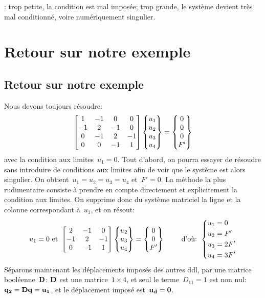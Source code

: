 \medskip
{}: trop petite, la condition est mal imposée; 
trop grande, le système devient très mal conditionné, voire numériquement singulier.

\medskip
\ifVersionAvecExemplesSepares
  \section{Retour sur notre exemple}
\else
  \subsection{Retour sur notre exemple}
\fi
Nous devons toujours résoudre:
\begin{equation}
\MM*{1 & -1 & 0 & 0 \\ -1 & 2 & -1 & 0 \\ 0 & -1 & 2 & -1\\ 0&0&-1&1}
\VV*{u_1\\u_2\\u_3\\u_4}
=
\VV*{0\\0\\0\\F'}
\end{equation}
avec la condition aux limites~$u_1=0$.
\medskipvm
Tout d'abord, on pourra essayer de résoudre sans introduire de conditions aux limites afin de voir que le système est alors singulier. On obtient~$u_1=u_2=u_3=u_4$ et~$F'=0$.
\medskipvm
La méthode la plus rudimentaire consiste à prendre en compte directement et explicitement la condition aux limites.
On supprime donc du système matriciel la ligne et la colonne correspondant à~$u_1$, et on résout:
\begin{equation}\label{Eq-Base}
u_1=0 \text{ et }
\MM*{2 & -1 & 0 \\ -1 & 2 & -1\\ 0&-1&1}
\VV*{u_2\\u_3\\u_4}
=
\VV*{0\\0\\F'}
\qquad \text{ d'où: } 
\left\{\begin{aligned} &u_1=0 \\ &u_2=F' \\ &u_3=2F' \\ &u_4=3F' \end{aligned}\right.
\end{equation}
\medskipvm
Séparons maintenant les déplacements imposés des autres ddl, par une matrice booléenne~$\MM{D}$:
$\MM{D}$ est une matrice~$1\times 4$, et seul le terme~$D_{11}=1$ est non nul:~$\VV{q_2}=\MM{D}\VV{q}=\VV{u_1}$,
et le déplacement imposé est~$\VV{u_d}=\VV{0}$.

